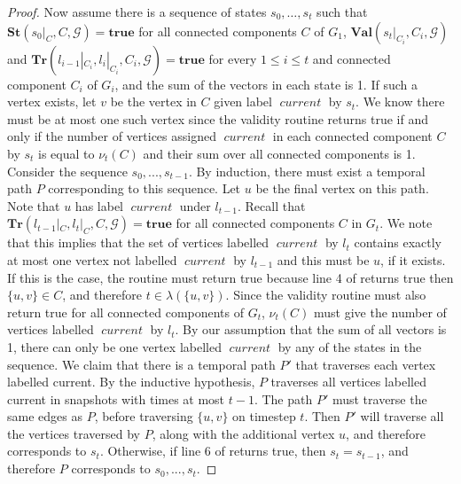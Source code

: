 \documentclass[a4paper,UKenglish,cleveref, autoref, thm-restate]{lipics-v2021} %
\DeclareMathOperator{\current}{\textit{current}}
\begin{document}
\begin{toappendix}
\begin{proof}
    Now assume there is a sequence of states $s_0, \ldots, s_t$ such that $\textbf{St}(s_0|_C,C,\mathcal{G})=\textbf{true}$ for all connected components $C$ of $G_1$, $\textbf{Val}(s_t|_{C_i},C_i,\mathcal{G})$ and $\textbf{Tr}(l_{i-1}|_{C_i}, l_i|_{C_i}, C_i,\mathcal{G})=\textbf{true}$ for every $1 \leq i \leq t$ and connected component $C_i$ of $G_i$, and the sum of the vectors in each state is 1. If such a vertex exists, let $v$ be the vertex in $C$ given label $\current$ by $s_t$. We know there must be at most one such vertex since the validity routine returns true if and only if the number of vertices assigned $\current$ in each connected component $C$ by $s_t$ is equal to $\nu_t(C)$ and their sum over all connected components is 1. Consider the sequence $s_0, ..., s_{t-1}$. By induction, there must exist a temporal path $P$ corresponding to this sequence. Let $u$ be the final vertex on this path. Note that $u$ has label $\current$ under $l_{t-1}$. Recall that $\textbf{Tr}(l_{t-1}|_C, l_t|_C, C,\mathcal{G})=\textbf{true}$ for all connected components $C$ in $G_t$. We note that this implies that the set of vertices labelled $\current$ by $l_t$ contains exactly at most one vertex not labelled $\current$ by $l_{t-1}$ and this must be $u$, if it exists. If this is the case, the routine must return true because line 4 of  returns true then $\{u,v\} \in C$, and therefore $t \in \lambda(\{u,v\})$. Since the validity routine must also return true for all connected components of $G_t$, $\nu_t(C)$ must give the number of vertices labelled $\current$ by $l_t$. By our assumption that the sum of all vectors is 1, there can only be one vertex labelled $\current$ by any of the states in the sequence. We claim that there is a temporal path $P'$ that traverses each vertex labelled current. By the inductive hypothesis, $P$ traverses all vertices labelled current in snapshots with times at most $t-1$. The path $P'$ must traverse the same edges as $P$, before traversing $\{u,v\}$ on timestep $t$. Then $P'$ will traverse all the vertices traversed by $P$, along with the additional vertex $u$, and therefore corresponds to $s_t$. Otherwise, if line 6 of  returns true, then $s_t = s_{t-1}$, and therefore $P$ corresponds to $s_0, ..., s_t$.
\end{proof}

\temphamtimthm*


\end{toappendix}
\end{document}
